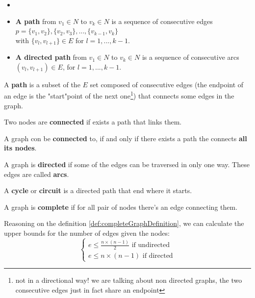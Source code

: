         \begin{definition}[Path]
            \begin{itemize}
                \item[]
                \item[] \textbf{A path} from $v_1 \in N$ to $v_k \in N$ is a sequence of consecutive edges $p =  \{v_1 , v_2 \}, \{v_2 , v_3 \}, . . . , \{v_{k-1} , v_k \}$\\with $\{v_l , v_{l+1}\} \in E$ for $l = 1, . . . , k - 1$.
                \item[] \textbf{A directed path} from $v_1 \in N$ to $v_k \in N$ is a sequence of consecutive arcs $(v_l , v_{l+1}) \in E$, for $l = 1, . . . , k - 1$.
            \end{itemize}
        \end{definition}
        A \textbf{path} is a subset of the $E$ set composed of consecutive edges (the endpoint of an edge is the "start"point of the next one\footnote{not in a directional way! we are talking about non directed graphs, the two consecutive edges just in fact share an endpoint}) that connects some edges in the graph.
        \begin{definition}
            Two nodes are \textbf{connected} if exists a path that links them.
        \end{definition}
        \begin{definition}
            A graph con be \textbf{connected} to, if and only if there exists a path the connects \textbf{all its nodes}.
        \end{definition}
        \begin{definition}
            A graph is \textbf{directed} if some of the edges can be traversed in only one way. These edges are called \textbf{arcs}.
        \end{definition}
        \begin{definition}
            A \textbf{cycle} or \textbf{circuit} is a directed path that end where it starts.
        \end{definition}
        \begin{definition}
            \label{def:completeGraphDefinition}
            A graph is \textbf{complete} if for all pair of nodes there's an edge connecting them.
        \end{definition}
        Reasoning on the definition \ref{def:completeGraphDefinition}, we can calculate the upper bounds for the number of edges given the nodes: 
        \begin{equation}
            \begin{cases}
                e \leq \frac{n \times (n-1)}{2} \text{ if undirected} \\
                e \leq n \times (n-1) \text{ if directed}
            \end{cases}
        \end{equation}
